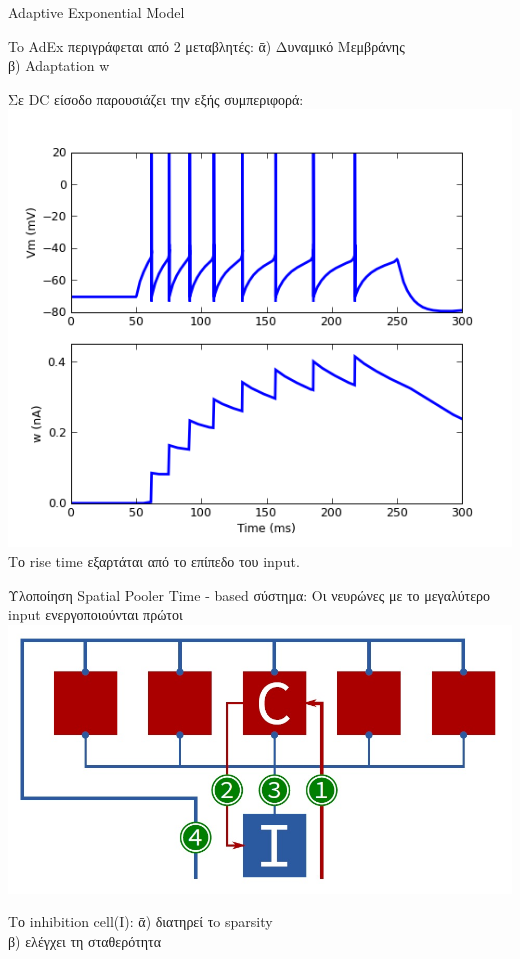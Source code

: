 \documentclass[11pt,center]{beamer}
\begin{document}
\begin{frame}{Adaptive Exponential Model}
  \begin{tabbing}
	To AdEx περιγράφεται από 2 μεταβλητές:  \=α) Δυναμικό Μεμβράνης\\
	  \>β) Adaptation w
  \end{tabbing}
	  \pause
	  Σε DC είσοδο παρουσιάζει την εξής συμπεριφορά:
	  \includegraphics[width=0.4 \textwidth,center]{../pics/adex.jpg}
	  \pause
	  \vfill
	  Tο rise time εξαρτάται από το επίπεδο του input.

\end{frame}

\begin{frame}{Υλοποίηση Spatial Pooler \tiny{\cite{htmheidelberg}}}
  Time - based σύστημα: Οι νευρώνες με το μεγαλύτερο input ενεργοποιούνται πρώτοι\\
  \vspace{2em}
  \includegraphics[width=0.5 \textwidth,center]{../pics/spatial_hardware.jpg}
  \pause
  \vfill
  \begin{tabbing}
	Το inhibition cell(I):  \= α) διατηρεί τo sparsity\\
	  \> β) ελέγχει τη σταθερότητα\\
  \end{tabbing}
\end{frame}
\end{document}
